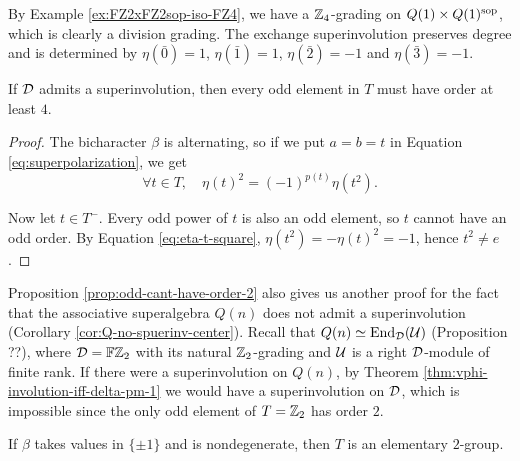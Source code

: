 \begin{ex}\label{ex:FZ4-revisited}
    By Example \ref{ex:FZ2xFZ2sop-iso-FZ4}, we have a $\mathbb{Z}_4$-grading on $Q(1)\times Q(1)^{\mathrm{sop}}$, which is clearly a division grading. 
    The exchange superinvolution preserves degree and is determined by $\eta (\bar 0) = 1$, $\eta (\bar 1) = 1$, $\eta (\bar 2) = -1$ and $\eta (\bar 3) = -1$.
\end{ex}

\begin{prop}\label{prop:odd-cant-have-order-2}
    If $\mathcal{D}$ admits a superinvolution, %
    then every odd element in $T$ must have order at least $4$.
\end{prop}

\begin{proof}
    The bicharacter $\beta$ is alternating, so if we put $a = b = t$ in Equation \eqref{eq:superpolarization}, we get
    \begin{equation}\label{eq:eta-t-square}
        \forall t\in T, \quad \eta (t)^2 = (-1)^{p(t)} \eta(t^2).
    \end{equation}
    
    Now let $t\in T^-$. 
    Every odd power of $t$ is also an odd element, so $t$ cannot have an odd order. 
    By Equation \eqref{eq:eta-t-square}, $\eta (t^2) = - \eta(t)^2 = -1$, hence $t^2 \neq e$.
\end{proof}

\begin{remark}
    Proposition \ref{prop:odd-cant-have-order-2} also gives us another proof for the fact that the associative superalgebra $Q(n)$ does not admit a superinvolution (Corollary \ref{cor:Q-no-spuerinv-center}). 
    Recall that $Q(n) \simeq \operatorname{End}_{\mathcal{D}} (\mathcal U)$ (Proposition ??), where $\mathcal{D}= \mathbb{F}\mathbb{Z}_2$ with its natural $\mathbb{Z}_2$-grading and $\mathcal U$ is a right $\mathcal{D}$-module of finite rank. 
    If there were a superinvolution on $Q(n)$, by Theorem \ref{thm:vphi-involution-iff-delta-pm-1} we would have a superinvolution on $\mathcal{D}$, which is impossible since the only odd element of $T = \mathbb{Z}_2$ has order $2$. 
\end{remark}

\begin{lemma}\label{lemma:beta-nondeg-elem-2-grp}
    If $\beta$ takes values in $\{ \pm 1 \}$ and is nondegenerate, then $T$ is an elementary $2$-group.
\end{lemma}

